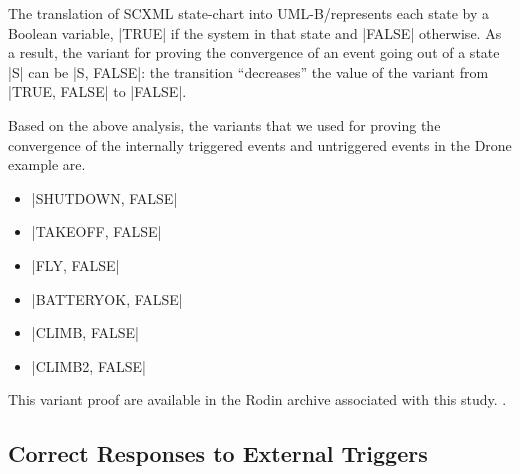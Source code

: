 The translation of SCXML state-chart into UML-B/\EventB represents each
state by a Boolean variable, |TRUE| if the system in that state and
|FALSE| otherwise. As a result, the variant for proving the convergence
of an event going out of a state |S| can be |{S, FALSE}|: the
transition ``decreases'' the value of the variant from |{TRUE, FALSE}|
to |FALSE|.

Based on the above analysis, the variants that we used for proving the
convergence of the internally triggered events and untriggered events
in the Drone example are.
\begin{itemize}
\item |{SHUTDOWN, FALSE}|

\item |{TAKEOFF, FALSE}|

\item |{FLY, FALSE}|

\item |{BATTERYOK, FALSE}|

\item |{CLIMB, FALSE}|

\item |{CLIMB2, FALSE}|
\end{itemize}

This variant proof are available in the Rodin archive associated with this study.
.


\subsection{Correct Responses to External Triggers}
\label{sec:corr-resp-extern}


